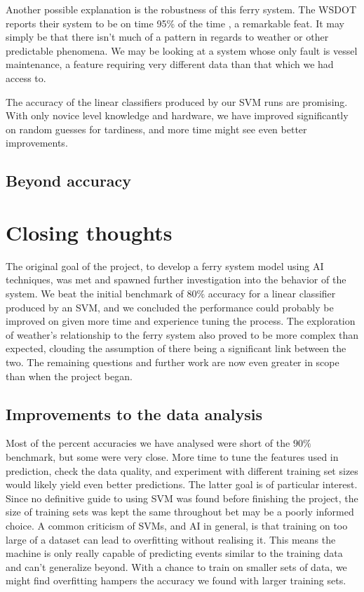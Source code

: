 \documentclass[11pt]{article} %
\begin{document}
Another possible explanation is the robustness of this ferry system. The  
WSDOT reports their system to be on time 95\% of the time \cite{wsdotComparison},
a remarkable feat. It may simply be that there isn't much of a pattern in regards
to weather or other predictable phenomena. We may be looking at a system whose
only fault is vessel maintenance, a feature requiring very different data than
that which we had access to. 

The accuracy of the linear classifiers produced by our SVM runs are promising.
With only novice level knowledge and hardware, we have improved significantly on
random guesses for tardiness, and more time might see even better improvements.

\subsection{Beyond accuracy}
\label{sec:beyond_accuracy}

\section{Closing thoughts}
\label{sec:summary}
The original goal of the project, to develop a ferry system model using AI 
techniques, was met and spawned further investigation into the behavior of the
system. We beat the initial benchmark of $80\%$ accuracy for a linear classifier 
produced by an SVM, and we concluded the performance could probably be improved
on given more time and experience tuning the process. The exploration of weather's
relationship to the ferry system also proved to be more complex than expected, 
clouding the assumption of there being a significant link between the two. The 
remaining questions and further work are now even greater in scope than when
the project began.


\subsection{Improvements to the data analysis}
\label{sec:improvements}
Most of the percent accuracies we have analysed were short of the $90\%$ benchmark,
but some were very close. More time to tune the features used in prediction, 
check the data quality, and experiment with different training set sizes would
likely yield even better predictions. The latter goal is of particular interest.
Since no definitive guide to using SVM was found before finishing the project, 
the size of training sets was kept the same throughout bet may be a poorly informed
choice. A common criticism of SVMs, and AI in general, is that training on too
large of a dataset can lead to overfitting without realising it. This means the
machine is only really capable of predicting events similar to the training data
and can't generalize beyond. With a chance to train on smaller sets of data,
we might find overfitting hampers the accuracy we found with larger training sets.
\end{document}
